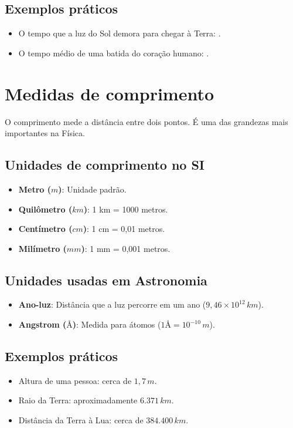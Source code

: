 	\subsection*{Exemplos práticos}
	\begin{itemize}
		\item O tempo que a luz do Sol demora para chegar à Terra: .
		\item O tempo médio de uma batida do coração humano: .
	\end{itemize}
	
	\section{Medidas de comprimento}
	O comprimento mede a distância entre dois pontos. É uma das grandezas mais importantes na Física.
	
	\subsection*{Unidades de comprimento no SI}
	\begin{itemize}
		\item \textbf{Metro (\(m\))}: Unidade padrão.
		\item \textbf{Quilômetro (\(km\))}: 1 km = 1000 metros.
		\item \textbf{Centímetro (\(cm\))}: 1 cm = 0,01 metros.
		\item \textbf{Milímetro (\(mm\))}: 1 mm = 0,001 metros.
	\end{itemize}
	
	\subsection*{Unidades usadas em Astronomia}
	\begin{itemize}
		\item \textbf{Ano-luz}: Distância que a luz percorre em um ano (\(9,46 \times 10^{12} \, km\)).
		\item \textbf{Angstrom (\(Å\))}: Medida para átomos (\(1 Å = 10^{-10} \, m\)).
	\end{itemize}
	
	\subsection*{Exemplos práticos}
	\begin{itemize}
		\item Altura de uma pessoa: cerca de \(1,7 \, m\).
		\item Raio da Terra: aproximadamente \(6.371 \, km\).
		\item Distância da Terra à Lua: cerca de \(384.400 \, km\).
	\end{itemize}
	
